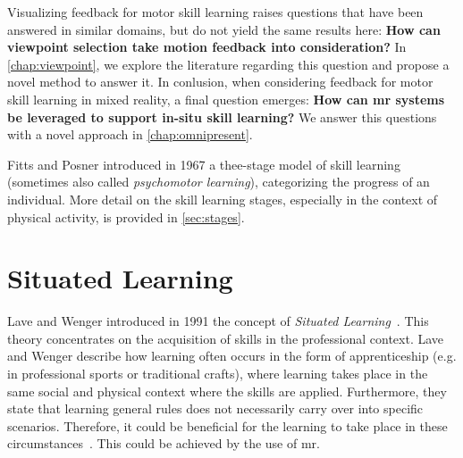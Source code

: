 Visualizing feedback for motor skill learning raises questions that have been answered in similar domains, but do not yield the same results here: \textbf{How can viewpoint selection take motion feedback into consideration?} In \autoref{chap:viewpoint}, we explore the literature regarding this question and propose a novel method to answer it. In conlusion, when considering feedback for motor skill learning in mixed reality, a final question emerges: \textbf{How can \acrlong{mr} systems be leveraged to support in-situ skill learning?} We answer this questions with a novel approach in \autoref{chap:omnipresent}.


Fitts and Posner introduced in 1967 a thee-stage model of skill learning (sometimes also called \emph{psychomotor learning}), categorizing the progress of an individual. More detail on the skill learning stages, especially in the context of physical activity, is provided in \autoref{sec:stages}.

\section{Situated Learning \label{sec:situated}}
Lave and Wenger introduced in 1991 the concept of \emph{Situated Learning}~\cite{lave:wenger:1991}. This theory concentrates on the acquisition of skills in the professional context. Lave and Wenger describe how learning often occurs in the form of apprenticeship (e.g. in professional sports or traditional crafts), where learning takes place in the same social and physical context where the skills are applied. Furthermore, they state that learning general rules does not necessarily carry over into specific scenarios. Therefore, it could be beneficial for the learning to take place in these circumstances~\cite[p. 34]{lave:wenger:1991}. This could be achieved by the use of \acrshort{mr}.